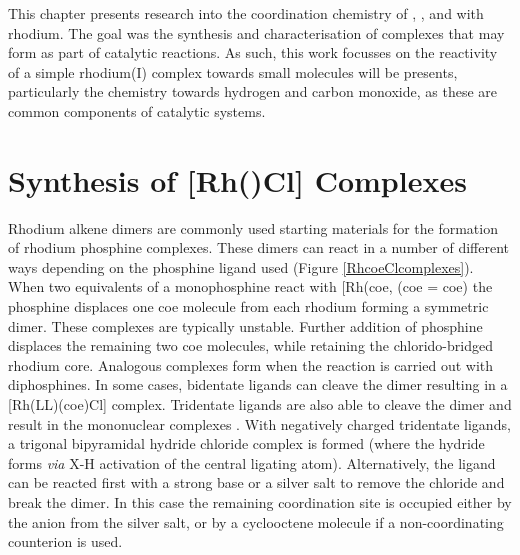 This chapter presents research into the coordination chemistry of \tBusixantphos, \tButhixantphos, and \tBuxantphos{} with rhodium.  The goal was the synthesis and characterisation of complexes that may form as part of catalytic reactions.  As such, this work focusses on the reactivity of a simple rhodium(I) complex towards small molecules will be presents, particularly the chemistry towards hydrogen and carbon monoxide, as these are common components of catalytic systems.  

\section{Synthesis of [Rh(\POP)Cl] Complexes}
\label{section:rhodiumchloride}

Rhodium alkene dimers are commonly used starting materials for the formation of rhodium phosphine complexes.  These dimers can react in a number of different ways depending on the phosphine ligand used (Figure \ref{RhcoeClcomplexes}).  When two equivalents of a monophosphine react with [Rh(\acrshort{coe}\ce{)2Cl]2}, (\acrshort{coe} = \acrlong{coe}) the phosphine displaces one \acrshort{coe} molecule from each rhodium forming a symmetric dimer.\cite{Canepa2003}  These complexes are typically unstable.  Further addition of phosphine displaces the remaining two \acrshort{coe} molecules, while retaining the chlorido-bridged rhodium core.\cite{Bleeke1986}  Analogous complexes form when the reaction is carried out with diphosphines.\cite{Fryzuk1989}  In some cases, bidentate ligands can cleave the dimer resulting in a [Rh(LL)(\acrshort{coe})Cl] complex.\cite{Hashimoto2010}  Tridentate ligands are also able to cleave the dimer and result in the mononuclear complexes \ce{[Rh(LLL)Cl]}\cite{Khan1988, Hermann2002}.  With negatively charged tridentate ligands, a trigonal bipyramidal hydride chloride complex is formed (where the hydride forms \emph{via} X-H activation of the central ligating atom).\cite{Boom1998, Winter2003, Salem2008}  Alternatively, the ligand can be reacted first with a strong base or a silver salt to remove the chloride and break the dimer.  In this case the remaining coordination site is occupied either by the anion from the silver salt, or by a cyclooctene molecule if a non-coordinating counterion is used.\cite{Fryzuk1986, Hanson2008}


